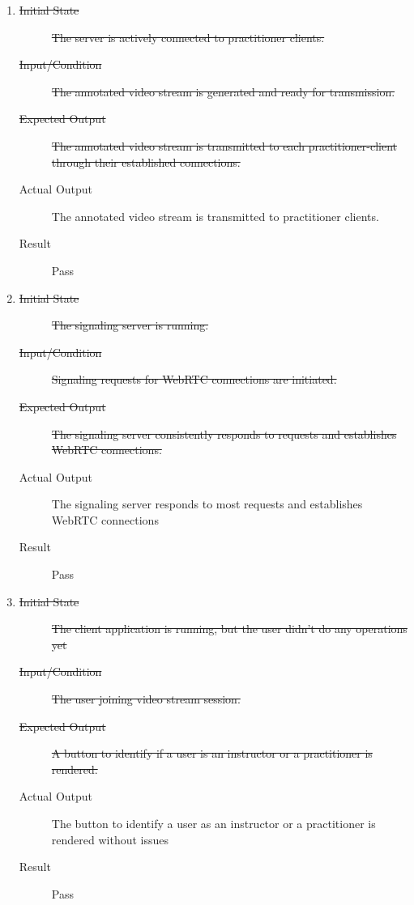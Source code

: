 \documentclass[12pt, titlepage]{article}
\begin{document}
\begin{enumerate}[FR-T1]
\item \label{FRT10}
  \begin{description}
  \item[\sout{Initial State}] \sout{The server is actively connected to
      practitioner clients.}
  \item[\sout{Input/Condition}] \sout{The annotated video stream is generated and
      ready for transmission.}
  \item[\sout{Expected Output}] \sout{The annotated video stream is transmitted
      to each practitioner-client through their established connections.}
  \item[Actual Output] The annotated video stream is transmitted to practitioner
    clients.
  \item[Result] Pass
  \end{description}
\item \label{FRT11}
  \begin{description}
  \item[\sout{Initial State}] \sout{The signaling server is running.}
  \item[\sout{Input/Condition}] \sout{Signaling requests for WebRTC connections
      are initiated.}
  \item[\sout{Expected Output}] \sout{The signaling server consistently responds
      to requests and establishes WebRTC connections.}
  \item[Actual Output] The signaling server responds to most requests and
    establishes WebRTC connections
  \item[Result] Pass
  \end{description}
\item \label{FRT12}
  \begin{description}
  \item[\sout{Initial State}] \sout{The client application is running, but the
      user didn’t do any operations yet}
  \item[\sout{Input/Condition}] \sout{The user joining video stream session.}
  \item[\sout{Expected Output}] \sout{A button to identify if a user is an
      instructor or a practitioner is rendered.}
  \item[Actual Output] The button to identify a user as an instructor or a
    practitioner is rendered without issues
  \item[Result] Pass
  \end{description}
\end{enumerate}
\end{document}
